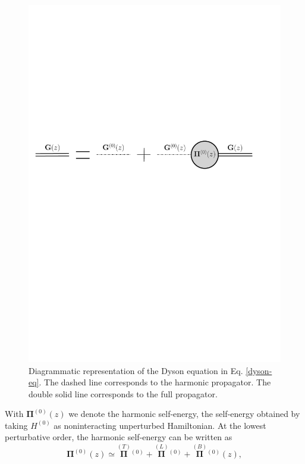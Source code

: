 \begin{figure}[h]
\begin{center}
\includegraphics[width=0.95\linewidth]{Figures/dyson.pdf}
\caption[Diagramtic representation of Dyson equation]{Diagrammatic representation of the Dyson equation in Eq. \ref{dyson-eq}. The dashed line corresponds to the harmonic propagator. The double solid 
line corresponds to the full propagator.}
\label{dyson}
\end{center}
\end{figure}
With $\boldsymbol{\Pi}^{(0)}(z)$ we denote the harmonic self-energy, the self-energy obtained by taking $H^{(0)}$ as 
noninteracting unperturbed Hamiltonian. At the lowest perturbative order, the harmonic self-energy can be written as
\begin{equation}
\label{self-energy}
\boldsymbol{\Pi}^{(0)}(z)\simeq\overset{(T)}{\boldsymbol{\Pi}}{}^{(0)}+\overset{(L)}{\boldsymbol{\Pi}}{}^{(0)}+\overset{(B)}{\boldsymbol{\Pi}}{}^{(0)}(z),
\end{equation}
